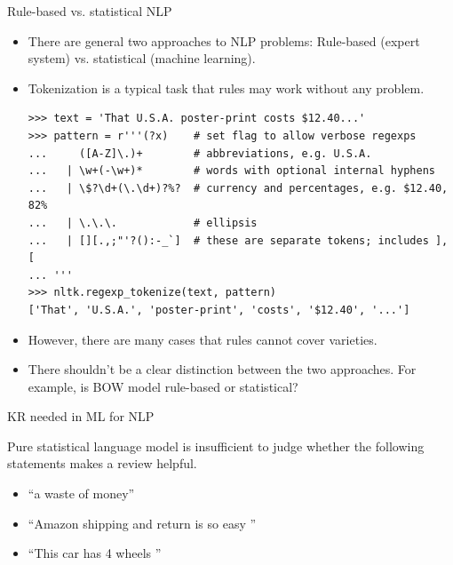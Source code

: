 \documentclass[11pt,handout]{beamer}
\begin{document}
\begin{frame}[fragile]{Rule-based vs. statistical NLP}
 \begin{itemize}[<+->]
  \item There are general two approaches to NLP problems: Rule-based (expert system) vs. statistical (machine learning). 
  \item Tokenization is a typical task that rules may work without any problem. 
{\scriptsize
 \begin{verbatim}
>>> text = 'That U.S.A. poster-print costs $12.40...'
>>> pattern = r'''(?x)    # set flag to allow verbose regexps
...     ([A-Z]\.)+        # abbreviations, e.g. U.S.A.
...   | \w+(-\w+)*        # words with optional internal hyphens
...   | \$?\d+(\.\d+)?%?  # currency and percentages, e.g. $12.40, 82%
...   | \.\.\.            # ellipsis
...   | [][.,;"'?():-_`]  # these are separate tokens; includes ], [
... '''
>>> nltk.regexp_tokenize(text, pattern)
['That', 'U.S.A.', 'poster-print', 'costs', '$12.40', '...']
\end{verbatim}
}

\item However, there are many cases that rules cannot cover varieties. 
\item There shouldn't be a clear distinction between the two approaches. For example, is BOW model rule-based or statistical? 
 \end{itemize}
\end{frame}

\begin{frame}{KR needed in ML for NLP}
 
 Pure statistical language model is insufficient to judge whether the following statements makes a review helpful. 
  \begin{itemize} [<+->]
  \item ``a waste of money''
  \item ``Amazon shipping and return is so easy ''  
  \item  ``This car has 4 wheels '' 
 \end{itemize} 
\end{frame}
\end{document}
